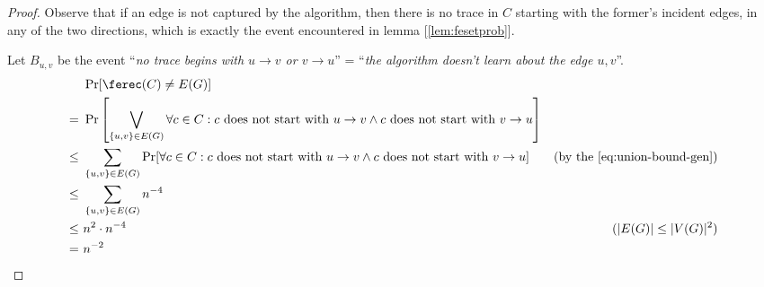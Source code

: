 \begin{proof}

    Observe that if an edge is not captured by the algorithm, then there is no trace in $C$ starting with the former's incident edges, in any of the two directions, which is exactly the event encountered in lemma [\ref{lem:fesetprob}].


    Let $B_{u,v}$ be the event ``\textit{no trace begins with $u \to v$ or $v \to u$}'' = ``\textit{the algorithm doesn't learn about the edge {$u,v$}}''.
    \begin{align*}
            &\ \Pr[\ferec(C) \neq E(G)]         & \\
           =&\ \Pr \left[ \bigvee_{\{u, v\} \in E(G)} \forall c \in C : c \text{ does not start with } u \to v \wedge c \text{ does not start with } v \to u \right] & \\
        \leq&\ \sum_{\{u,v\} \in E(G)} \Pr[\forall c \in C : c \text{ does not start with } u \to v \wedge c \text{ does not start with } v \to u] & \text{(by the \ref{eq:union-bound-gen})} \\
        \leq&\ \sum_{\{u,v\} \in E(G)} n^{-4}   & \\
        \leq&\ n^2 \cdot n^{-4}                 & (|E(G)| \leq |V(G)|^2) \\
           =&\ n^{-2}                           & \\
    \end{align*}
    
\end{proof}
